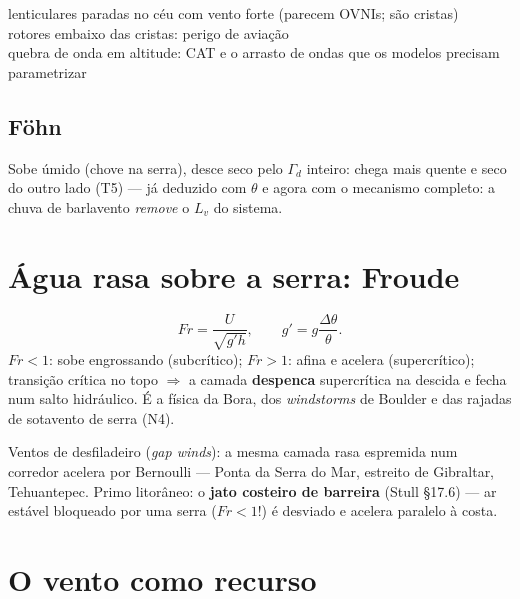 \documentclass[11pt]{article}
\begin{document}
\begin{noquadro}
lenticulares paradas no céu com vento forte (parecem OVNIs; são
cristas)\\
rotores embaixo das cristas: perigo de aviação\\
quebra de onda em altitude: CAT  e o arrasto
de ondas que os modelos precisam parametrizar
\end{noquadro}

\subsection{Föhn}

Sobe úmido (chove na serra), desce seco pelo $\Gamma_d$ inteiro: chega
mais quente e seco do outro lado (T5) — já deduzido com $\theta$
 e agora com o mecanismo completo: a chuva de
barlavento \emph{remove} o $L_v$ do sistema.

\section{Água rasa sobre a serra: Froude}\label{sec:hidra}


\begin{formadif}
\[ Fr = \frac{U}{\sqrt{g'h}},\qquad g' = g\frac{\Delta\theta}{\theta}. \]
$Fr<1$: sobe engrossando (subcrítico); $Fr>1$: afina e acelera
(supercrítico); transição crítica no topo $\Rightarrow$ a camada
\textbf{despenca} supercrítica na descida e fecha num salto
hidráulico. É a física da Bora, dos \emph{windstorms} de Boulder e
das rajadas de sotavento de serra (N4).
\end{formadif}

Ventos de desfiladeiro (\emph{gap winds}): a mesma camada rasa
espremida num corredor acelera por Bernoulli — Ponta da Serra do Mar,
estreito de Gibraltar, Tehuantepec. Primo litorâneo: o \textbf{jato
costeiro de barreira} (Stull \S17.6) — ar estável bloqueado por uma
serra ($Fr < 1$!) é desviado e acelera paralelo à costa.

\section{O vento como recurso}\label{sec:eolica}
\end{document}
